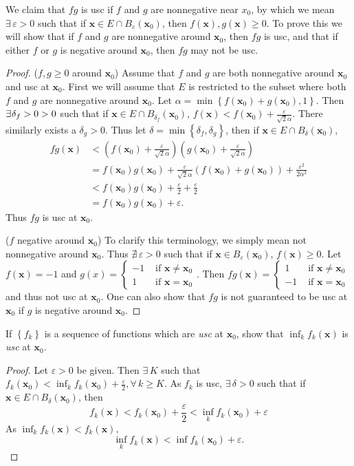 \documentclass[12pt]{book}
\newcommand{\set}[1]{\left\{ #1 \right\}}
\renewcommand{\i}{\cap}
\newcommand{\x}{\mathbf{x}}
\renewcommand{\t}[1]{\text{ #1 }}
\renewcommand{\.}{\mkern1mu}
\newcommand{\e}{\varepsilon}
\newcommand{\lr}[1]{\left(#1\right)}
\newenvironment{pf}{\begin{proof}\setlength{\parindent}{\normalparindent}\setlength{\parskip}{\normalparskip}}{\end{proof}}
\theoremstyle{theorem}
\newlength{\normalparindent}
\newlength{\normalparskip}
\begin{document}
		 We claim that $fg$ is usc if $f$ and $g$ are nonnegative near $x_0$, by which we mean $\exists\, \e> 0$ such that if $\x\in E\i B_\e(\x_0)$, then $f(\x), g(\x) \geq 0$. To prove this we will show that if $f$ and $g$ are nonnegative around $\x_0$, then $fg$ is usc, and that if either $f$ or $g$ is negative around $\x_0$, then $fg$ may not be usc.
		 \begin{pf}
		 ($f,g \geq 0$ around $\x_0$) Assume that $f$ and $g$ are both nonnegative around $\x_0$ and usc at $\x_0$. First we will assume that $E$ is restricted to the subset where both $f$ and $g$ are nonnegative around $\x_0$. Let $\alpha = \min\set{f(\x_0) + g(\x_0), 1}$. Then $\exists\. \delta_f > 0 > 0$ such that if $\x\in E\i B_{\delta_f}(\x_0)$, $f(\x) < f(\x_0) + \frac{\e}{\sqrt{2}\alpha}$. There similarly exists a $\delta_g > 0$. Thus let $\delta = \min\set{\delta_f, \delta_g}$, then if $\x\in E\i B_\delta(\x_0),$ 
		\begin{align*}
		fg(\x) &< \lr{f(\x_0) + \frac{\e}{\sqrt{2}\alpha}}\lr{g(\x_0) + \frac{\e}{\sqrt{2}\alpha}}\\
			&= f(\x_0)g(\x_0) + \frac{\e}{\sqrt{2}\alpha}(f(\x_0) + g(\x_0)) + \frac{\e^2}{2\alpha^2}\\
			&< f(\x_0)g(\x_0) + \frac{\e}{2} + \frac{\e}{2}\\
			&= f(\x_0)g(\x_0) + \e. 
		\end{align*}
		Thus $fg$ is usc at $\x_0$.
		
		($f$ negative around $\x_0$) To clarify this terminology, we simply mean not nonnegative around $\x_0$. Thus $\nexists\,\e>0$ such that if $\x\in B_\e(\x_0)$, $f(\x) \geq 0$. Let $f(\x) = -1$ and $g(x) =\left\{\begin{array}{rl} -1 &\t{if} \x\neq\x_0\\ 1 &\t{if} \x=\x_0\end{array}\right.$. Then $fg(\x) = \left\{\begin{array}{rl}1 &\t{if} \x\neq\x_0\\ -1 &\t{if} \x=\x_0\end{array}\right.$ and thus not usc at $\x_0$. One can also show that $fg$ is not guaranteed to be usc at $\x_0$ if $g$ is negative around $\x_0$.	  
		 \end{pf}
	
	\item If $\set{f_k}$ is a sequence of functions which are \textit{usc} at $\x_0$, show that $\inf_k f_k(\x)$ is \textit{usc} at $\x_0$.
		\begin{pf}
		Let $\e>0$ be given. Then $\exists\, K$ such that $f_k(\x_0) < \inf_k f_k(\x_0) + \frac{\e}{2}, \forall\, k \geq K$. As $f_k$ is usc, $\exists\, \delta > 0$ such that if $\x \in E\i B_\delta(\x_0)$, then 
			\[ f_k(\x) < f_k(\x_0) + \frac{\e}{2} < \inf_kf_k(\x_0) + \e\]
		 As $\inf_kf_k(\x) < f_k(\x),$
			\[\inf_k f_k(\x) < \inf f_k(\x_0) + \e.\]
		\end{pf}
	
\end{document}
